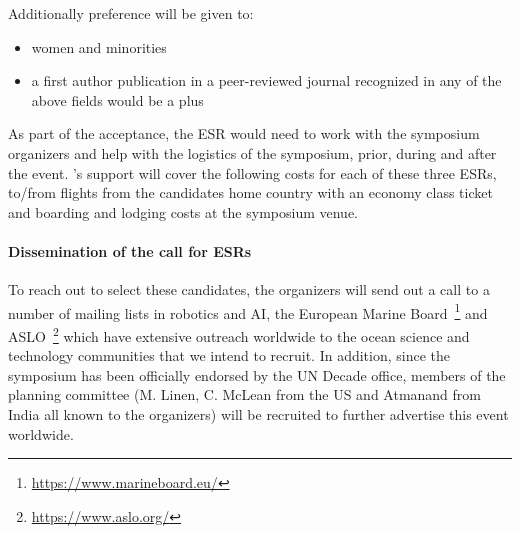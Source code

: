 \noindent
Additionally preference will be given to:

\begin{itemize}[noitemsep,topsep=0pt,parsep=0pt,partopsep=0pt]
\item women and minorities
\item a first author publication in a peer-reviewed journal recognized
  in any of the above fields would be a plus 
\end{itemize}

\noindent
As part of the acceptance, the ESR would need to work with the symposium
organizers and help with the logistics of the symposium, prior, during
and after the event. \nsfe's support will cover the following costs for
each of these three ESRs, to/from flights from the candidates home
country with an economy class ticket and boarding and lodging costs at
the symposium venue.

\paragraph{Dissemination of the call for ESRs} To reach out to select
these candidates, the organizers will send out a call to a number of
mailing lists in robotics and AI, the European Marine
Board~\footnote{\url{https://www.marineboard.eu/}} and
ASLO~\footnote{\url{https://www.aslo.org/}} which have extensive
outreach worldwide to the ocean science and technology communities
that we intend to recruit. In addition, since the symposium has been
officially endorsed by the UN Decade office, members of the planning
committee (M. Linen, C. McLean from the US and Atmanand from India all
known to the organizers) will be recruited to further advertise this
event worldwide. %
